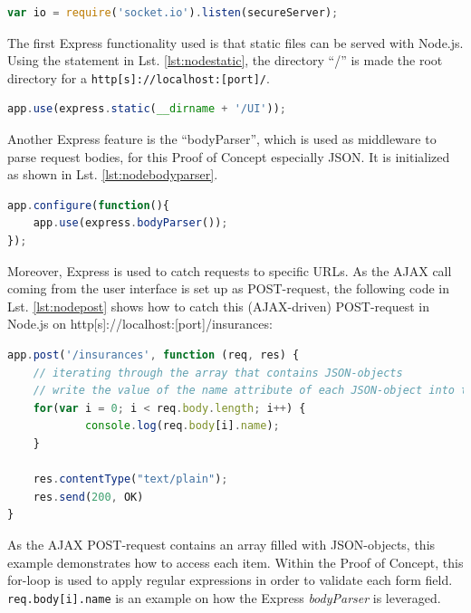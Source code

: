 \begin{lstlisting}[language=javascript,caption={Initialization of the socket.io module in Node.js},label=lst:requiresocketio]
var io = require('socket.io').listen(secureServer);
\end{lstlisting}

The first Express functionality used is that static files can be served with
Node.js. Using the statement in Lst. \ref{lst:nodestatic}, the directory “/” is made the root
directory for a \texttt{http[s]://localhost:[port]/}.

\begin{lstlisting}[language=javascript,caption={Serving static assets with Express},label=lst:nodestatic]
app.use(express.static(__dirname + '/UI'));
\end{lstlisting}

Another Express feature is the “bodyParser”, which is used as middleware to
parse request bodies, for this Proof of Concept especially JSON. It is initialized as shown in Lst. \ref{lst:nodebodyparser}.

\begin{lstlisting}[language=javascript,caption={Using the bodyParser},label=lst:nodebodyparser]
app.configure(function(){
    app.use(express.bodyParser());
});
\end{lstlisting}

Moreover, Express is used to catch requests to specific URLs. As the AJAX call coming from the user interface is set up as POST-request, the following code in Lst. \ref{lst:nodepost} shows how to catch this (AJAX-driven) POST-request in Node.js on http[s]://localhost:[port]/insurances:

\begin{lstlisting}[language=javascript,caption={Iteration through an array consisting of JSON data},label=lst:nodepost]
app.post('/insurances', function (req, res) {
	// iterating through the array that contains JSON-objects
	// write the value of the name attribute of each JSON-object into the console
	for(var i = 0; i < req.body.length; i++) {
        	console.log(req.body[i].name);
	}

	res.contentType("text/plain");
	res.send(200, OK)
}
\end{lstlisting}

As the AJAX POST-request contains an array filled with JSON-objects, this
example demonstrates how to access each item. Within the Proof of Concept, this
for-loop is used to apply regular expressions in order to validate each form
field. \texttt{req.body[i].name} is an example on how the Express \textit{bodyParser} is leveraged.

